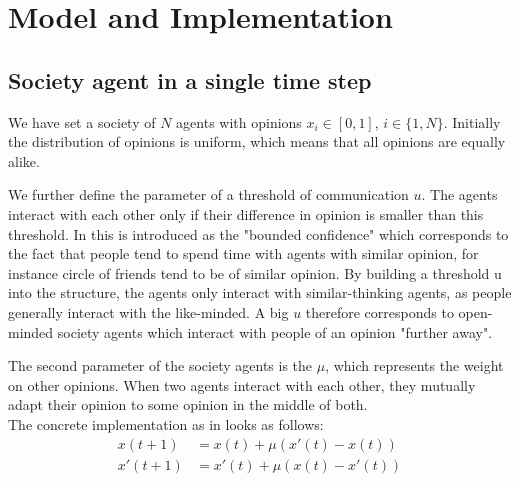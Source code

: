 \documentclass[11pt]{article}
\begin{document}
\section{Model and Implementation}
\subsection{Society agent in a single time step}
We have set a society of $N$ agents with opinions $x_i \in [0,1]$, $i \in \{1, N \}$. Initially the distribution of opinions is uniform, which means that all opinions are equally alike.

We further define the parameter of a threshold of communication $u$. The agents interact with each other only if their difference in opinion is smaller than this threshold. In \cite{Minor} this is introduced as the "bounded confidence" which corresponds to the fact that people tend to spend time with agents with similar opinion, for instance circle of friends tend to be of similar opinion. By building a threshold u into the structure, the agents only interact with similar-thinking agents, as people generally interact with the like-minded. A big $u$ therefore corresponds to open-minded society agents which interact with people of an opinion "further away".

The second parameter of the society agents is the $\mu$, which represents the weight on other opinions. When two agents interact with each other, they mutually adapt their opinion to some opinion in the middle of both. \\

The concrete implementation as in \cite{Minor} looks as follows:
\begin{equation}
\begin{aligned}
x(t+1) &= x(t) + \mu(x'(t) - x(t))  \\
x'(t+1) &= x'(t) + \mu(x(t) - x'(t)) 
\end{aligned}
\end{equation}
\end{document}
